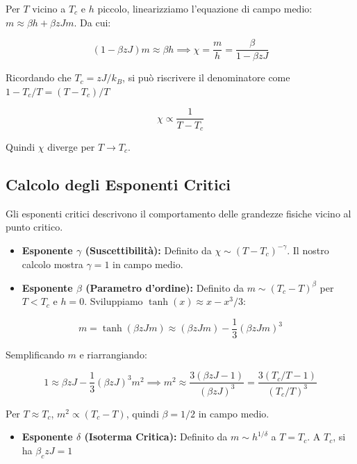 Per $T$ vicino a $T_c$ e $h$ piccolo, linearizziamo l'equazione di campo medio: $m \approx \beta h + \beta z J m$.
Da cui:

\begin{equation} \label{eq:ch18_9}
(1 - \beta z J)m \approx \beta h \implies \chi = \frac{m}{h} = \frac{\beta}{1 - \beta z J}
\end{equation}

Ricordando che $T_c = zJ/k_B$, si può riscrivere il denominatore come $1 - T_c/T = (T - T_c)/T$

\begin{equation} \label{eq:ch18_10}
\chi \propto \frac{1}{T - T_c}
\end{equation}

Quindi $\chi$ diverge per $T \to T_c$.

\subsection*{Calcolo degli Esponenti Critici}
Gli esponenti critici descrivono il comportamento delle grandezze fisiche vicino al punto critico.

\begin{itemize}
    \item \textbf{Esponente $\gamma$ (Suscettibilità):} Definito da $\chi \sim (T - T_c)^{-\gamma}$. Il nostro calcolo mostra $\gamma = 1$ in campo medio.
    \item \textbf{Esponente $\beta$ (Parametro d’ordine):} Definito da $m \sim (T_c - T)^{\beta}$ per $T < T_c$ e $h=0$. Sviluppiamo $\tanh(x) \approx x - x^3/3$:
\end{itemize}

\begin{equation} \label{eq:ch18_11}
m = \tanh(\beta z J m) \approx (\beta z J m) - \frac{1}{3}(\beta z J m)^3
\end{equation}

Semplificando $m$ e riarrangiando:

\begin{equation} \label{eq:ch18_12}
1 \approx \beta z J - \frac{1}{3}(\beta z J)^3 m^2 \implies m^2 \approx \frac{3( \beta z J - 1)}{(\beta z J)^3} = \frac{3(T_c/T - 1)}{(T_c/T)^3}
\end{equation}

Per $T \approx T_c$, $m^2 \propto (T_c - T)$, quindi $\beta = 1/2$ in campo medio.

\begin{itemize}
    \item \textbf{Esponente $\delta$ (Isoterma Critica):} Definito da $m \sim h^{1/\delta}$ a $T = T_c$. A $T_c$, si ha $\beta_c z J = 1$
\end{itemize}

